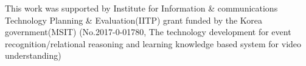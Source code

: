 \documentclass[10pt,twocolumn,letterpaper]{article}
\begin{document}
This work was supported by Institute for Information \& communications Technology Planning \& Evaluation(IITP) grant funded by the Korea government(MSIT) (No.2017-0-01780, The technology development for event recognition/relational reasoning and learning knowledge based system for video understanding)


{\small


}
\clearpage
\end{document}
